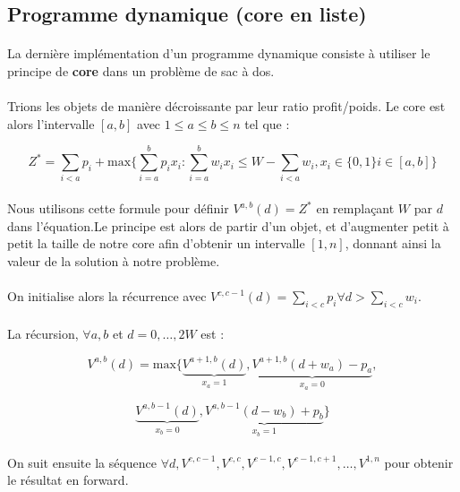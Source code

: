 \documentclass[12pt]{article}
\begin{document}
\subsection{Programme dynamique (core en liste)}

\paragraph{}La dernière implémentation d'un programme dynamique consiste à utiliser le principe de \textbf{core} dans un problème de sac à dos.

\paragraph{}Trions les objets de manière décroissante par leur ratio profit/poids. Le core est alors l'intervalle $[a,b]$ avec $1 \leq a \leq b \leq n$ tel que :

\[
Z^*=\sum_{i<a}p_i+\mathrm{max}
\lbrace
\sum_{i=a}^b p_i x_i : \sum_{i=a}^b w_i x_i \leq W - \sum_{i<a} w_i,
x_i \in \lbrace 0,1 \rbrace i \in [a,b]
\rbrace
\]

\paragraph{}Nous utilisons cette formule pour définir $V^{a,b}(d) = Z^*$ en remplaçant $W$ par $d$ dans l'équation.Le principe est alors de partir d'un objet, et d'augmenter petit à petit la taille de notre core afin d'obtenir un intervalle $[1,n]$, donnant ainsi la valeur de la solution à notre problème.

\paragraph{}On initialise alors la récurrence avec $V^{c,c-1}(d) = \sum_{i<c}p_i \forall d > \sum_{i<c}w_i$.

\paragraph{}La récursion, $\forall a,b$ et $d=0,\ldots,2W$ est :

\[
V^{a,b}(d)=\mathrm{max}
\lbrace
\underbrace{
	V^{a+1,b}(d)
}_{x_a=1},
\underbrace{
	V^{a+1,b}(d+w_a)-p_a
}_{x_a=0},
\]

\[
\underbrace{
	V^{a,b-1}(d)
}_{x_b=0},
\underbrace{
	V^{a,b-1}(d-w_b)+p_b
}_{x_b=1}
\rbrace
\]

\paragraph{}On suit ensuite la séquence $\forall d, V^{c,c-1},V^{c,c},V^{c-1,c},V^{c-1,c+1},\ldots,V^{1,n}$ pour obtenir le résultat en forward.
\end{document}
